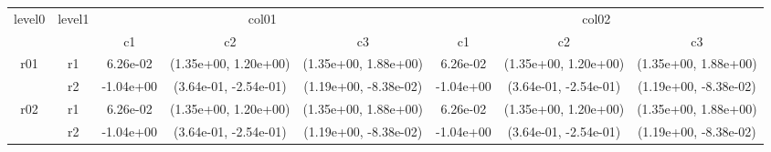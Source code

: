 \begin{tabular}{cccccccc}
\toprule
\multirow{2}{*}{level0} & \multirow{2}{*}{level1}&\multicolumn{3}{c}{col01}&\multicolumn{3}{c}{col02}\tabularnewline
\cmidrule(lr){3-5}
\cmidrule(lr){6-8}
&&c1&c2&c3&c1&c2&c3\tabularnewline
\midrule
\midrule
\multirow{2}{*}{r01}&r1&6.26e-02& (1.35e+00, 1.20e+00)& (1.35e+00, 1.88e+00)&6.26e-02& (1.35e+00, 1.20e+00)& (1.35e+00, 1.88e+00)\tabularnewline
&r2&-1.04e+00& (3.64e-01, -2.54e-01)& (1.19e+00, -8.38e-02)&-1.04e+00& (3.64e-01, -2.54e-01)& (1.19e+00, -8.38e-02)\tabularnewline
\midrule
\multirow{2}{*}{r02}&r1&6.26e-02& (1.35e+00, 1.20e+00)& (1.35e+00, 1.88e+00)&6.26e-02& (1.35e+00, 1.20e+00)& (1.35e+00, 1.88e+00)\tabularnewline
&r2&-1.04e+00& (3.64e-01, -2.54e-01)& (1.19e+00, -8.38e-02)&-1.04e+00& (3.64e-01, -2.54e-01)& (1.19e+00, -8.38e-02)\tabularnewline
\bottomrule
\end{tabular}
